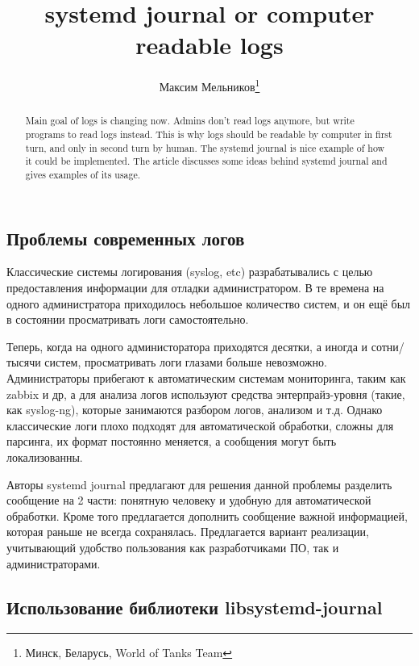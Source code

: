 \documentclass[10pt, a5paper]{article}
\begin{document}
\title{systemd journal or computer readable logs}%

\author{Максим Мельников\footnote{Минск, Беларусь, World of Tanks Team}}
\maketitle

\begin{abstract}
Main goal of logs is changing now. Admins don't read logs anymore, but write programs to read logs instead. This is why logs should be readable by computer in first turn, and only in second turn by human.
The systemd journal is nice example of how it could be implemented. The article discusses some ideas behind systemd journal and gives examples of its usage.
\end{abstract}

\subsection*{Проблемы современных логов}

Классические системы логирования (syslog, etc) разрабатывались с целью предоставления информации для отладки администратором. В те времена на одного администратора приходилось небольшое количество систем, и он ещё был в состоянии просматривать логи самостоятельно.

Теперь, когда на одного администоратора приходятся десятки, а иногда и сотни/тысячи систем, просматривать логи глазами больше невозможно. Администраторы прибегают к автоматическим системам мониторинга, таким как zabbix и др, а для анализа логов используют средства энтерпрайз-уровня (такие, как syslog-ng), которые занимаются разбором логов, анализом и т.д. Однако классические логи плохо подходят для автоматической обработки, сложны для парсинга, их формат постоянно меняется, а сообщения могут быть локализованны.

Авторы systemd journal предлагают для решения данной проблемы разделить сообщение на 2 части: понятную человеку и удобную для автоматической обработки. Кроме того предлагается дополнить сообщение важной информацией, которая раньше не всегда сохранялась. Предлагается вариант реализации, учитывающий удобство пользования как разработчиками ПО, так и администраторами.

\newpage
\subsection*{Использование библиотеки libsystemd-journal}
\end{document}
